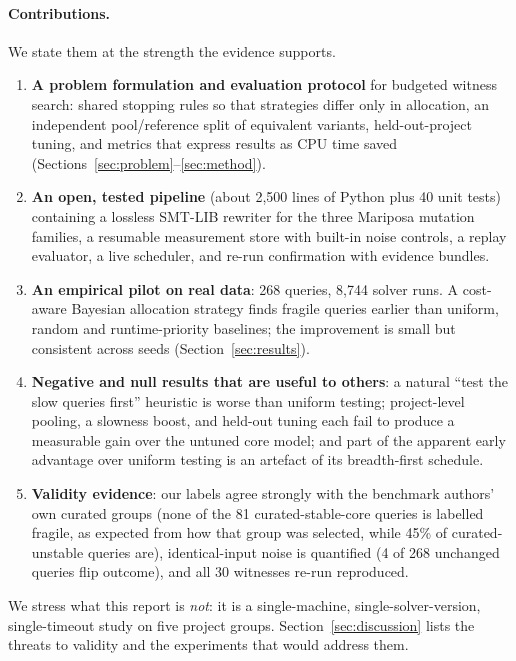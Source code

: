 \documentclass[11pt]{article}
\begin{document}
\paragraph{Contributions.} We state them at the strength the evidence supports.
\begin{enumerate}
  \item \textbf{A problem formulation and evaluation protocol} for budgeted witness search: shared stopping rules so that strategies differ only in allocation, an independent pool/reference split of equivalent variants, held-out-project tuning, and metrics that express results as CPU time saved (Sections~\ref{sec:problem}--\ref{sec:method}).
  \item \textbf{An open, tested pipeline} (about 2{,}500 lines of Python plus 40 unit tests) containing a lossless SMT-LIB rewriter for the three Mariposa mutation families, a resumable measurement store with built-in noise controls, a replay evaluator, a live scheduler, and re-run confirmation with evidence bundles.
  \item \textbf{An empirical pilot on real data}: 268 queries, 8{,}744 solver runs. A cost-aware Bayesian allocation strategy finds fragile queries earlier than uniform, random and runtime-priority baselines; the improvement is small but consistent across seeds (Section~\ref{sec:results}).
  \item \textbf{Negative and null results that are useful to others}: a natural ``test the slow queries first'' heuristic is worse than uniform testing; project-level pooling, a slowness boost, and held-out tuning each fail to produce a measurable gain over the untuned core model; and part of the apparent early advantage over uniform testing is an artefact of its breadth-first schedule.
  \item \textbf{Validity evidence}: our labels agree strongly with the benchmark authors' own curated groups (none of the 81 curated-stable-core queries is labelled fragile, as expected from how that group was selected, while 45\% of curated-unstable queries are), identical-input noise is quantified (4 of 268 unchanged queries flip outcome), and all 30 witnesses re-run reproduced.
\end{enumerate}
We stress what this report is \emph{not}: it is a single-machine, single-solver-version, single-timeout study on five project groups. Section~\ref{sec:discussion} lists the threats to validity and the experiments that would address them.

\end{document}
